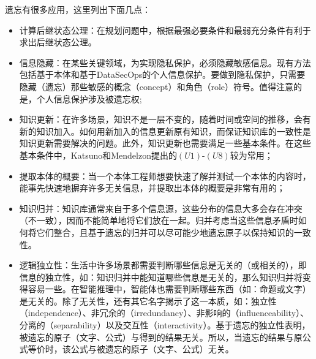 遗忘有很多应用，这里列出下面几点：
\begin{itemize}
	\item 计算后继状态公理：在规划问题中，根据最强必要条件和最弱充分条件有利于求出后继状态公理\cite{DBLP:journals/jair/Lin03}。%
	\item 信息隐藏：在某些关键领域，为实现隐私保护，必须隐藏敏感信息。现有方法包括基于本体\cite{DBLP:journals/ai/KonevL0W13}和基于DataSecOps的个人信息保护\cite{wangwen2021}。要做到隐私保护，只需要隐藏（遗忘）那些敏感的概念（concept）和角色（role）符号。值得注意的是，个人信息保护涉及被遗忘权\cite{zhujia2020};
	\item 知识更新：在许多场景，知识不是一层不变的，随着时间或空间的推移，会有新的知识加入。如何用新加入的信息更新原有知识，而保证知识库的一致性是知识更新需要解决的问题。此外，知识更新也需要满足一些基本条件。在这些基本条件中，Katsuno和Mendelzon提出的$(U1)$-$(U8)$较为常用；%
	\item 提取本体的概要：当一个本体工程师想要快速了解并测试一个本体的内容时，能事先快速地摒弃许多无关信息，并提取出本体的概要是非常有用的；
	\item 知识归并：知识库通常来自于多个信息源，这些分布的信息大多会存在冲突（不一致），因而不能简单地将它们放在一起。归并考虑当这些信息矛盾时如何将它们整合\cite{DBLP:journals/tkde/LiberatoreS98,DBLP:journals/logcom/KoniecznyP02,DBLP:journals/jair/Maynard-ZhangL03,konieczny2004da2,DBLP:journals/ai/EveraereKM10}，且基于遗忘的归并可以尽可能少地遗忘原子以保持知识的一致性\cite{xudai2011}。
	\item 逻辑独立性：生活中许多场景都需要判断哪些信息是无关的（或相关的），即信息的独立性\cite{DBLP:journals/jphil/Sandu93,DBLP:journals/igpl/Sandu97,DBLP:journals/igpl/Vaananen02,DBLP:journals/synthese/Sevenster06}，如：知识归并中能知道哪些信息是无关的，那么知识归并将变得容易一些。在智能推理中，智能体也需要判断哪些东西（如：命题或文字）是无关的。除了无关性，还有其它名字揭示了这一本质，如：独立性（independence）、非冗余的（irredundancy）、非影响的（influenceability）、分离的（separability）以及交互性（interactivity）。基于遗忘的独立性表明，被遗忘的原子（文字、公式）与得到的结果无关。所以，当遗忘的结果与原公式等价时，该公式与被遗忘的原子（文字、公式）无关\cite{xudai2011}。
\end{itemize}







